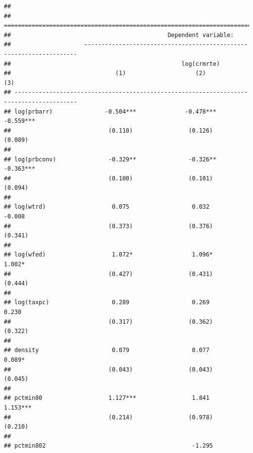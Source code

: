 \documentclass[]{article}
\begin{document}
\begin{verbatim}
## 
## ========================================================================================
##                                             Dependent variable:                         
##                     --------------------------------------------------------------------
##                                                 log(crmrte)                             
##                              (1)                    (2)                    (3)          
## ----------------------------------------------------------------------------------------
## log(prbarr)               -0.504***              -0.478***              -0.559***       
##                            (0.110)                (0.126)                (0.089)        
##                                                                                         
## log(prbconv)               -0.329**               -0.326**              -0.363***       
##                            (0.100)                (0.101)                (0.094)        
##                                                                                         
## log(wtrd)                   0.075                  0.032                  -0.008        
##                            (0.373)                (0.376)                (0.341)        
##                                                                                         
## log(wfed)                   1.072*                 1.096*                 1.002*        
##                            (0.427)                (0.431)                (0.444)        
##                                                                                         
## log(taxpc)                  0.289                  0.269                  0.230         
##                            (0.317)                (0.362)                (0.322)        
##                                                                                         
## density                     0.079                  0.077                  0.089*        
##                            (0.043)                (0.043)                (0.045)        
##                                                                                         
## pctmin80                   1.127***                1.841                 1.153***       
##                            (0.214)                (0.978)                (0.210)        
##                                                                                         
## pctmin802                                          -1.295                               

\end{verbatim}
\end{document}
